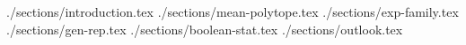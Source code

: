 \documentclass[pdflatex,sn-mathphys-num]{sn-jnl}%
\theoremstyle{thmstyleone}%
\theoremstyle{thmstyletwo}%
\theoremstyle{thmstylethree}%
\begin{document}
% 
% 
% 




    \maketitle

    {./sections/introduction.tex}
    {./sections/mean-polytope.tex}
    {./sections/exp-family.tex}
    {./sections/gen-rep.tex}
    {./sections/boolean-stat.tex}
    {./sections/outlook.tex}

%    
\end{document}
